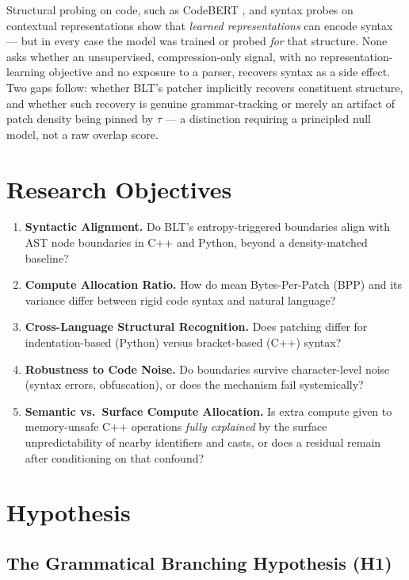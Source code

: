 Structural probing on code, such as CodeBERT \citep{feng2020codebert}, and syntax probes on contextual
representations \citep{hewitt2019structural} show that \emph{learned representations} can
encode syntax --- but in every case the model was trained or probed \emph{for} that
structure. None asks whether an unsupervised, compression-only signal, with no
representation-learning objective and no exposure to a parser, recovers syntax as a side
effect. Two gaps follow: whether BLT's patcher implicitly recovers constituent structure,
and whether such recovery is genuine grammar-tracking or merely an artifact of patch
density being pinned by $\tau$ --- a distinction requiring a principled null model, not a
raw overlap score.

\section{Research Objectives}

\begin{enumerate}[label=\textbf{O\arabic*.}]
\item \textbf{Syntactic Alignment.} Do BLT's entropy-triggered boundaries align with AST
node boundaries in C++ and Python, beyond a density-matched baseline?
\item \textbf{Compute Allocation Ratio.} How do mean Bytes-Per-Patch (BPP) and its
variance differ between rigid code syntax and natural language?
\item \textbf{Cross-Language Structural Recognition.} Does patching differ for
indentation-based (Python) versus bracket-based (C++) syntax?
\item \textbf{Robustness to Code Noise.} Do boundaries survive character-level noise
(syntax errors, obfuscation), or does the mechanism fail systemically?
\item \textbf{Semantic vs.\ Surface Compute Allocation.} Is extra compute given to
memory-unsafe C++ operations \emph{fully explained} by the surface unpredictability of
nearby identifiers and casts, or does a residual remain after conditioning on that
confound?
\end{enumerate}

\section{Hypothesis}

\subsection{The Grammatical Branching Hypothesis (H1)}

